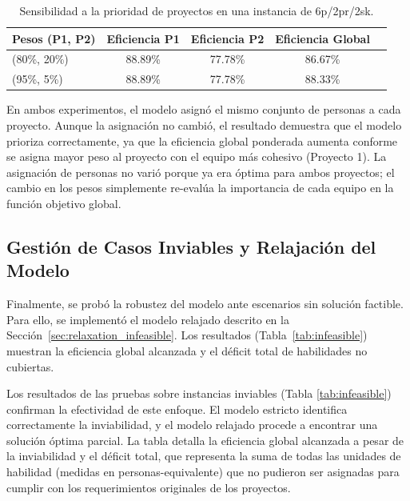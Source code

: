 \documentclass[conference]{IEEEtran}
\begin{document}
\begin{table}[htbp]
    \centering
    \caption{Sensibilidad a la prioridad de proyectos en una instancia de 6p/2pr/2sk.}
    \label{tab:sensibilidad}
    \begin{tabularx}{\linewidth}{@{}lcccc@{}}
        \toprule
        \textbf{Pesos (P1, P2)} & \textbf{Eficiencia P1} & \textbf{Eficiencia P2} & \textbf{Eficiencia Global} \\
        \midrule
        (80\%, 20\%)            & 88.89\%                & 77.78\%                & 86.67\%                    \\
        (95\%, 5\%)             & 88.89\%                & 77.78\%                & 88.33\%                    \\
        \bottomrule
    \end{tabularx}
\end{table}

En ambos experimentos, el modelo asignó el mismo conjunto de personas a cada proyecto. Aunque la asignación no cambió, el resultado demuestra que el modelo prioriza correctamente, ya que la eficiencia global ponderada aumenta conforme se asigna mayor peso al proyecto con el equipo más cohesivo (Proyecto 1). La asignación de personas no varió porque ya era óptima para ambos proyectos; el cambio en los pesos simplemente re-evalúa la importancia de cada equipo en la función objetivo global.

\subsection{Gestión de Casos Inviables y Relajación del Modelo}

Finalmente, se probó la robustez del modelo ante escenarios sin solución factible. Para ello, se implementó el modelo relajado descrito en la Sección~\ref{sec:relaxation_infeasible}. Los resultados (Tabla~\ref{tab:infeasible}) muestran la eficiencia global alcanzada y el déficit total de habilidades no cubiertas.

Los resultados de las pruebas sobre instancias inviables (Tabla \ref{tab:infeasible}) confirman la efectividad de este enfoque. El modelo estricto identifica correctamente la inviabilidad, y el modelo relajado procede a encontrar una solución óptima parcial. La tabla detalla la eficiencia global alcanzada a pesar de la inviabilidad y el déficit total, que representa la suma de todas las unidades de habilidad (medidas en personas-equivalente) que no pudieron ser asignadas para cumplir con los requerimientos originales de los proyectos.
\end{document}
